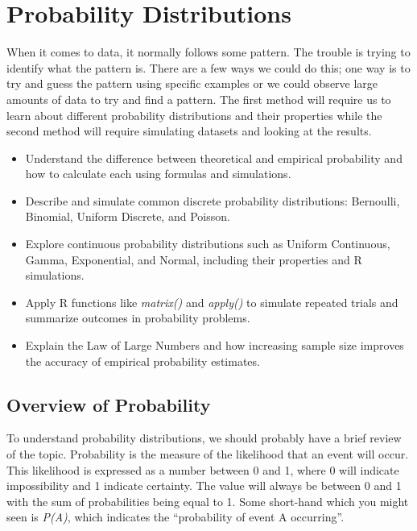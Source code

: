 \documentclass[
  letterpaper,
  DIV=11,
  numbers=noendperiod]{scrreprt}
\providecommand{\tightlist}{%
  \setlength{\itemsep}{0pt}\setlength{\parskip}{0pt}}
\begin{document}
\chapter{Probability Distributions}\label{probability-distributions}

When it comes to data, it normally follows some pattern. The trouble is
trying to identify what the pattern is. There are a few ways we could do
this; one way is to try and guess the pattern using specific examples or
we could observe large amounts of data to try and find a pattern. The
first method will require us to learn about different probability
distributions and their properties while the second method will require
simulating datasets and looking at the results.

\begin{itemize}
\tightlist
\item
  Understand the difference between theoretical and empirical
  probability and how to calculate each using formulas and
  simulations.\\
\item
  Describe and simulate common discrete probability distributions:
  Bernoulli, Binomial, Uniform Discrete, and Poisson.\\
\item
  Explore continuous probability distributions such as Uniform
  Continuous, Gamma, Exponential, and Normal, including their properties
  and R simulations.\\
\item
  Apply R functions like \emph{matrix()} and \emph{apply()} to simulate
  repeated trials and summarize outcomes in probability problems.\\
\item
  Explain the Law of Large Numbers and how increasing sample size
  improves the accuracy of empirical probability estimates.
\end{itemize}

\section{Overview of Probability}\label{overview-of-probability}

To understand probability distributions, we should probably have a brief
review of the topic. Probability is the measure of the likelihood that
an event will occur. This likelihood is expressed as a number between 0
and 1, where 0 will indicate impossibility and 1 indicate certainty. The
value will always be between 0 and 1 with the sum of probabilities being
equal to 1. Some short-hand which you might seen is \emph{P(A)}, which
indicates the ``probability of event A occurring''.
\end{document}
